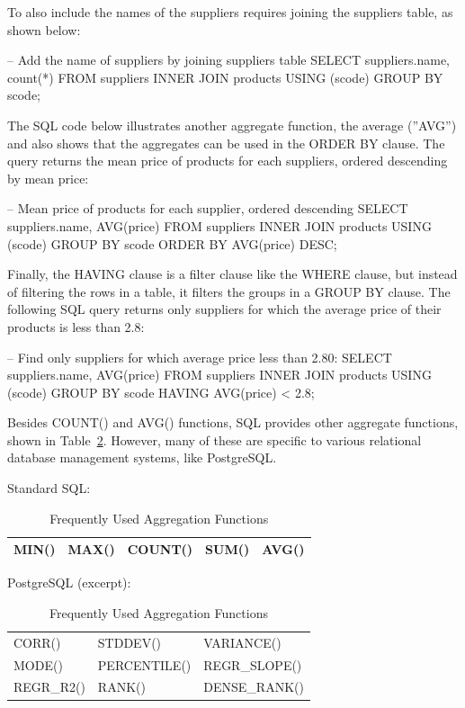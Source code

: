 To also include the names of the suppliers requires joining the suppliers table, as shown below:
\begin{sqlcode}
-- Add the name of suppliers by joining suppliers table
SELECT suppliers.name, count(*)
    FROM suppliers INNER JOIN products USING (scode)
    GROUP BY scode;
\end{sqlcode}

The SQL code below illustrates another aggregate function, the average (''AVG'') and also shows that the aggregates can be used in the ORDER BY clause. The query returns the mean price of products for each suppliers, ordered descending by mean price:

\begin{sqlcode}
-- Mean price of products for each supplier, ordered descending
SELECT suppliers.name, AVG(price)
    FROM suppliers INNER JOIN products USING (scode)
    GROUP BY scode
    ORDER BY AVG(price) DESC;
\end{sqlcode}

Finally, the HAVING clause is a filter clause like the WHERE clause, but instead of filtering the rows in a table, it filters the groups in a GROUP BY clause. The following SQL query returns only suppliers for which the average price of their products is less than 2.8:

\begin{sqlcode}
-- Find only suppliers for which average price less than 2.80:
SELECT suppliers.name, AVG(price)
    FROM suppliers INNER JOIN products USING (scode)
    GROUP BY scode
    HAVING AVG(price) < 2.8;
\end{sqlcode}

Besides COUNT() and AVG() functions, SQL provides other aggregate functions, shown in Table~\ref{tab:sqlaggregates}. However, many of these are specific to various relational database management systems, like PostgreSQL. 

\begin{table}
\centering

\renewcommand{\arraystretch}{1.5}
Standard SQL: \\

\small
\begin{tabular}{l|l|l|l|l} \hline
MIN() & MAX() & COUNT() & SUM() & AVG() \\ \hline
\end{tabular}

\normalsize

\vspace{\baselineskip}
PostgreSQL (excerpt):\\

\small
\begin{tabular}{l|l|l} \hline
CORR() & STDDEV() & VARIANCE() \\
MODE() & PERCENTILE() & REGR\_SLOPE() \\
REGR\_R2() & RANK() & DENSE\_RANK() \\ \hline
\end{tabular}

\caption{Frequently Used Aggregation Functions}
\label{tab:sqlaggregates}
\end{table}

